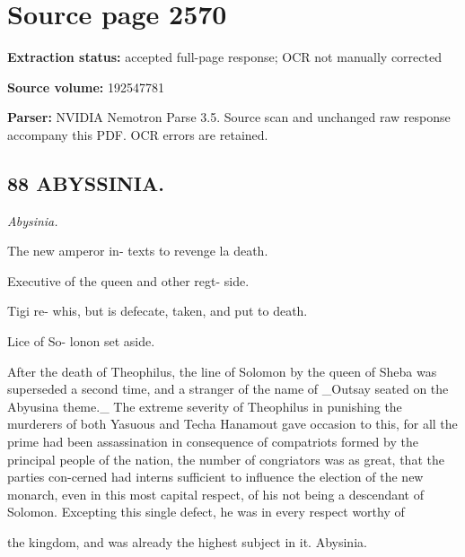 \clearpage
\section{Source page 2570}
\textbf{Extraction status:} accepted full-page response; OCR not manually corrected\par
\textbf{Source volume:} 192547781\par
\textbf{Parser:} NVIDIA Nemotron Parse 3.5. Source scan and unchanged raw response accompany this PDF. OCR errors are retained.\par\medskip
\subsection*{88 ABYSSINIA.}
{\small\itshape Abysinia.\par}\medskip
The new amperor in- texts to revenge la death.\par\medskip
Executive of the queen and other regt- side.\par\medskip
Tigi re- whis, but is defecate, taken, and put to death.\par\medskip
Lice of So- lonon set aside.\par\medskip
After the death of Theophilus, the line of Solomon by the queen of Sheba was superseded a second time, and a stranger of the name of \_Outsay seated on the Abyusina theme.\_ The extreme severity of Theophilus in punishing the murderers of both Yasuous and Techa Hanamout gave occasion to this, for all the prime had been assassination in consequence of compatriots formed by the principal people of the nation, the number of congriators was as great, that the parties con-cerned had interns sufficient to influence the election of the new monarch, even in this most capital respect, of his not being a descendant of Solomon. Excepting this single defect, he was in every respect worthy of\par\medskip
the kingdom, and was already the highest subject in it. Abysinia.\par\medskip

